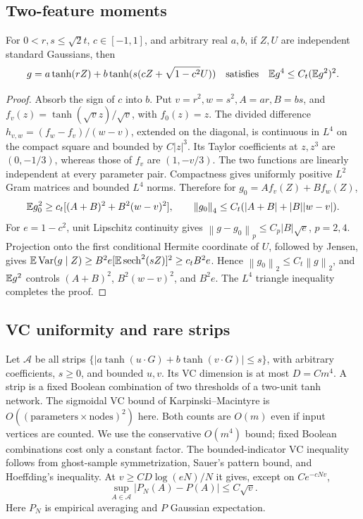 \documentclass[11pt]{article}
\newcommand{\norm}[1]{\left\lVert#1\right\rVert}
\begin{document}
\subsection{Two-feature moments}
\begin{lemma}\label{lem:L4}
For $0<r,s\le\sqrt2t$, $c\in[-1,1]$, and arbitrary real $a,b$, if $Z,U$ are independent standard Gaussians, then
\[
 g=a\tanh(rZ)+b\tanh(s(cZ+\sqrt{1-c^2}U))
 \quad\text{satisfies}\quad \mathbb E g^4\le C_t(\mathbb E g^2)^2.
\]
\end{lemma}
\begin{proof}
Absorb the sign of $c$ into $b$. Put $v=r^2,w=s^2,A=ar,B=bs$, and $f_v(z)=\tanh(\sqrt v z)/\sqrt v$, with $f_0(z)=z$. The divided difference $h_{v,w}=(f_w-f_v)/(w-v)$, extended on the diagonal, is continuous in $L^4$ on the compact square and bounded by $C|z|^3$. Its Taylor coefficients at $z,z^3$ are $(0,-1/3)$, whereas those of $f_v$ are $(1,-v/3)$. The two functions are linearly independent at every parameter pair. Compactness gives uniformly positive $L^2$ Gram matrices and bounded $L^4$ norms. Therefore for $g_0=Af_v(Z)+Bf_w(Z)$,
\[
 \E g_0^2\ge c_t[(A+B)^2+B^2(w-v)^2],\qquad
 \norm{g_0}_4\le C_t(|A+B|+|B||w-v|).
\]
For $e=1-c^2$, unit Lipschitz continuity gives $\norm{g-g_0}_p\le C_p|B|\sqrt e$, $p=2,4$. Projection onto the first conditional Hermite coordinate of $U$, followed by Jensen, gives
$\mathbb E\operatorname{Var}(g\mid Z)\ge B^2e[\mathbb E\operatorname{sech}^2(sZ)]^2\ge c_tB^2e$.
Hence $\norm{g_0}_2\le C_t\norm g_2$, and $\mathbb E g^2$ controls $(A+B)^2$, $B^2(w-v)^2$, and $B^2e$. The $L^4$ triangle inequality completes the proof.
\end{proof}

\subsection{VC uniformity and rare strips}
Let $\mathcal A$ be all strips
$\{|a\tanh(u\cdot G)+b\tanh(v\cdot G)|\le s\}$, with arbitrary coefficients, $s\ge0$, and bounded $u,v$. Its VC dimension is at most $D=Cm^4$. A strip is a fixed Boolean combination of two thresholds of a two-unit tanh network. The sigmoidal VC bound of Karpinski--Macintyre \cite{KM} is $O((\text{parameters}\times\text{nodes})^2)$ here. Both counts are $O(m)$ even if input vertices are counted. We use the conservative $O(m^4)$ bound; fixed Boolean combinations cost only a constant factor.
The bounded-indicator VC inequality follows from ghost-sample symmetrization, Sauer's pattern bound, and Hoeffding's inequality. At $v\ge CD\log(eN)/N$ it gives, except on $Ce^{-cNv}$,
\begin{equation}\label{eq:VCabs}
 \sup_{A\in\mathcal A}|P_N(A)-P(A)|\le C\sqrt v.
\end{equation}
Here $P_N$ is empirical averaging and $P$ Gaussian expectation.
\end{document}
